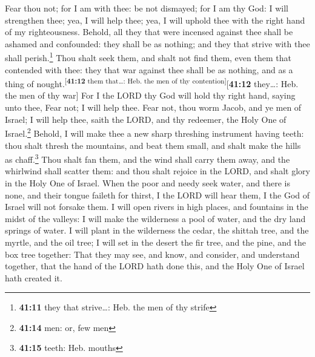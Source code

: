  Fear thou not; for I am with thee: be not dismayed; for
I am thy God: I will strengthen thee; yea, I will help thee; yea, I will
uphold thee with the right hand of my righteousness. 
Behold, all they that were incensed against thee shall be ashamed and
confounded: they shall be as nothing; and they that strive with thee
shall perish.\footnote{\textbf{41:11} they that strive\ldots: Heb. the
  men of thy strife}  Thou shalt seek them, and shalt not
find them, even them that contended with thee: they that war against
thee shall be as nothing, and as a thing of
nought.\textsuperscript{{[}\textbf{41:12} them that\ldots: Heb. the men
of thy contention{]}}{[}\textbf{41:12} they\ldots: Heb. the men of thy
war{]}  For I the LORD thy God will hold thy right hand,
saying unto thee, Fear not; I will help thee.  Fear not,
thou worm Jacob, and ye men of Israel; I will help thee, saith the LORD,
and thy redeemer, the Holy One of Israel.\footnote{\textbf{41:14} men:
  or, few men}  Behold, I will make thee a new sharp
threshing instrument having teeth: thou shalt thresh the mountains, and
beat them small, and shalt make the hills as chaff.\footnote{\textbf{41:15}
  teeth: Heb. mouths}  Thou shalt fan them, and the wind
shall carry them away, and the whirlwind shall scatter them: and thou
shalt rejoice in the LORD, and shalt glory in the Holy One of Israel.
 When the poor and needy seek water, and there is none,
and their tongue faileth for thirst, I the LORD will hear them, I the
God of Israel will not forsake them.  I will open rivers
in high places, and fountains in the midst of the valleys: I will make
the wilderness a pool of water, and the dry land springs of water.
 I will plant in the wilderness the cedar, the shittah
tree, and the myrtle, and the oil tree; I will set in the desert the fir
tree, and the pine, and the box tree together:  That they
may see, and know, and consider, and understand together, that the hand
of the LORD hath done this, and the Holy One of Israel hath created it.

